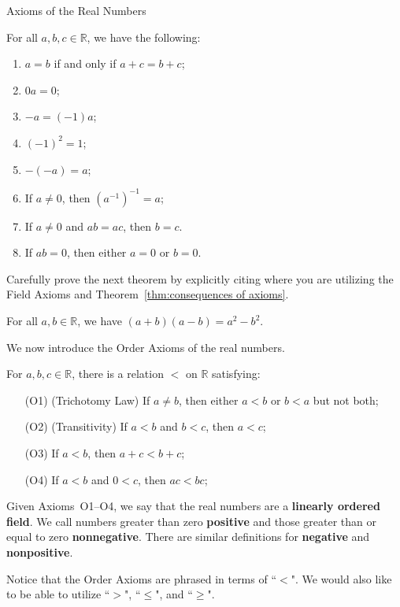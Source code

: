 \begin{section}{Axioms of the Real Numbers}
\begin{theorem}\label{thm:consequences of axioms}
For all $a,b,c\in\mathbb{R}$, we have the following:
\begin{enumerate}[label=\textrm{(\alph*)}]
\item $a=b$ if and only if $a+c=b+c$;
\item $0a=0$;
\item $-a=(-1)a$;
\item $(-1)^2 = 1$;
\item $-(-a)=a$;
\item If $a\neq 0$, then $(a^{-1})^{-1}=a$;
\item If $a\neq 0$ and $ab = ac$, then $b = c$.
\item If $ab=0$, then either $a=0$ or $b=0$.
\end{enumerate}
\end{theorem}

Carefully prove the next theorem by explicitly citing where you are utilizing the Field Axioms and Theorem~\ref{thm:consequences of axioms}.

\begin{theorem}
For all $a,b\in\mathbb{R}$, we have $(a+b)(a-b)=a^2-b^2$.
\end{theorem}

We now introduce the Order Axioms of the real numbers.

\begin{orderaxioms}\label{axiom:order axioms}
For $a,b,c\in \mathbb{R}$, there is a relation $\boxed{<}$ on $\mathbb{R}$ satisfying:
\begin{enumerate}
\item[(O1)] (Trichotomy Law) If $a\neq b$, then either $a<b$ or $b<a$ but not both;
\item[(O2)] (Transitivity) If $a<b$ and $b<c$, then $a<c$;
\item[(O3)] If $a<b$, then $a+c<b+c$;
\item[(O4)] If $a<b$ and $0<c$, then $ac<bc$;  
\end{enumerate}
\end{orderaxioms}

Given Axioms~O1--O4, we say that the real numbers are a \textbf{linearly ordered field}. We call numbers greater than zero \textbf{positive} and those greater than or equal to zero \textbf{nonnegative}. There are similar definitions for \textbf{negative} and \textbf{nonpositive}. 

Notice that the Order Axioms are phrased in terms of ``$<$". We would also like to be able to utilize ``$>$", ``$\leq$", and ``$\geq$".


\end{section}
